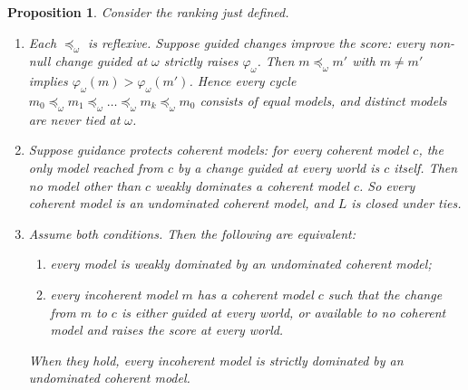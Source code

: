 \documentclass[11pt]{article}
\newtheorem{proposition}[theorem]{Proposition}
\theoremstyle{definition}
\theoremstyle{remark}
\begin{document}
\begin{proposition}\label{prop:construct}
Consider the ranking just defined.
\begin{enumerate}[label=(\alph*)]
\item Each $\preceq_\omega$ is reflexive. Suppose \emph{guided changes improve the score}: every non-null change guided at $\omega$ strictly raises $\varphi_\omega$. Then $m\preceq_\omega m'$ with $m\ne m'$ implies $\varphi_\omega(m)>\varphi_\omega(m')$. Hence every cycle $m_0\preceq_\omega m_1\preceq_\omega\dots\preceq_\omega m_k\preceq_\omega m_0$ consists of equal models, and distinct models are never tied at $\omega$.
\item Suppose \emph{guidance protects coherent models}: for every coherent model $c$, the only model reached from $c$ by a change guided at every world is $c$ itself. Then no model other than $c$ weakly dominates a coherent model $c$. So every coherent model is an undominated coherent model, and $L$ is closed under ties.
\item Assume both conditions. Then the following are equivalent:
\begin{enumerate}[label=(\roman*)]
\item every model is weakly dominated by an undominated coherent model;
\item every incoherent model $m$ has a coherent model $c$ such that the change from $m$ to $c$ is either guided at every world, or available to no coherent model and raises the score at every world.
\end{enumerate}
When they hold, every incoherent model is strictly dominated by an undominated coherent model.
\end{enumerate}
\end{proposition}
\end{document}
